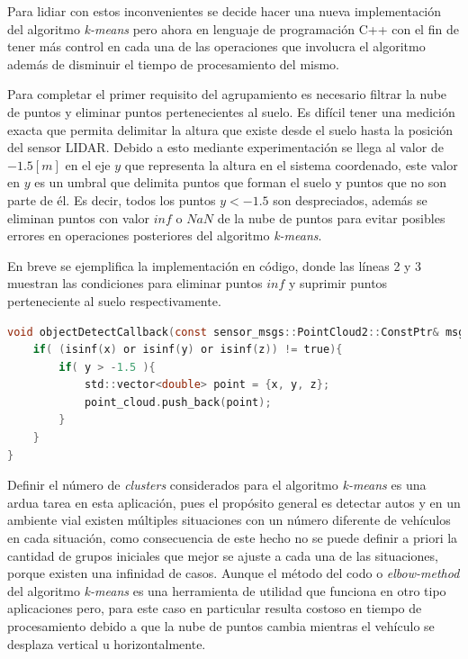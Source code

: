 Para lidiar con estos inconvenientes se decide hacer una nueva implementación del algoritmo \textit{k-means} pero ahora en lenguaje de programación C++ con el fin de tener más control en cada una de las operaciones que involucra el algoritmo además de disminuir el tiempo de procesamiento del mismo.

Para completar el primer requisito del agrupamiento es necesario filtrar la nube de puntos y eliminar puntos pertenecientes al suelo. Es difícil tener una medición exacta que permita delimitar la altura que existe desde el suelo hasta la posición del sensor LIDAR. Debido a esto mediante experimentación se llega al valor de $-1.5[m]$ en el eje $y$ que representa la altura en el sistema coordenado, este valor en $y$ es un umbral que delimita puntos que forman el suelo y puntos que no son parte de él. Es decir, todos los puntos $ y<-1.5$ son despreciados, además se eliminan puntos con valor $inf$ o $NaN$ de la nube de puntos para evitar posibles errores en operaciones posteriores del algoritmo \textit{k-means}. 

En breve se ejemplifica la implementación en código, donde las líneas 2 y 3 muestran las condiciones para eliminar puntos $inf$ y suprimir puntos perteneciente al suelo respectivamente.

\hfill
\begin{lstlisting}[language=C]
void objectDetectCallback(const sensor_msgs::PointCloud2::ConstPtr& msg){
    if( (isinf(x) or isinf(y) or isinf(z)) != true){
        if( y > -1.5 ){
            std::vector<double> point = {x, y, z};
            point_cloud.push_back(point);
        }
    }
}
\end{lstlisting}
\hfill

Definir el número de \textit{clusters} considerados para el algoritmo \textit{k-means} es una ardua tarea en esta aplicación, pues el propósito general es detectar autos y en un ambiente vial existen múltiples situaciones con un número diferente de vehículos en cada situación, como consecuencia de este hecho no se puede definir a priori la cantidad de grupos iniciales que mejor se ajuste a cada una de las situaciones, porque existen una infinidad de casos. Aunque el método del codo o \textit{elbow-method} del algoritmo \textit{k-means} es una herramienta de utilidad que funciona en otro tipo aplicaciones pero, para este caso en particular resulta costoso en tiempo de procesamiento debido a que la nube de puntos cambia mientras el vehículo se desplaza vertical u horizontalmente.

